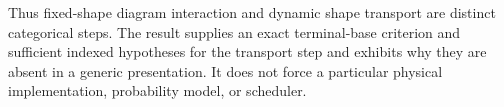 \documentclass[11pt]{article}
\begin{document}
Thus fixed-shape diagram interaction and dynamic shape transport are distinct categorical steps. The result supplies an exact terminal-base criterion and sufficient indexed hypotheses for the transport step and exhibits why they are absent in a generic presentation. It does not force a particular physical implementation, probability model, or scheduler.
\end{document}
